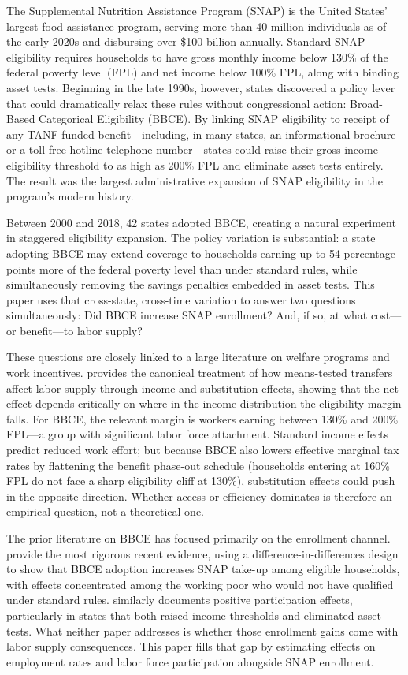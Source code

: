 \documentclass[12pt]{article}
\begin{document}
The Supplemental Nutrition Assistance Program (SNAP) is the United States' largest food assistance program, serving more than 40 million individuals as of the early 2020s and disbursing over \$100 billion annually. Standard SNAP eligibility requires households to have gross monthly income below 130\% of the federal poverty level (FPL) and net income below 100\% FPL, along with binding asset tests. Beginning in the late 1990s, however, states discovered a policy lever that could dramatically relax these rules without congressional action: Broad-Based Categorical Eligibility (BBCE). By linking SNAP eligibility to receipt of any TANF-funded benefit---including, in many states, an informational brochure or a toll-free hotline telephone number---states could raise their gross income eligibility threshold to as high as 200\% FPL and eliminate asset tests entirely. The result was the largest administrative expansion of SNAP eligibility in the program's modern history.

Between 2000 and 2018, 42 states adopted BBCE, creating a natural experiment in staggered eligibility expansion. The policy variation is substantial: a state adopting BBCE may extend coverage to households earning up to 54 percentage points more of the federal poverty level than under standard rules, while simultaneously removing the savings penalties embedded in asset tests. This paper uses that cross-state, cross-time variation to answer two questions simultaneously: Did BBCE increase SNAP enrollment? And, if so, at what cost---or benefit---to labor supply?

These questions are closely linked to a large literature on welfare programs and work incentives. \citet{moffitt2002welfare} provides the canonical treatment of how means-tested transfers affect labor supply through income and substitution effects, showing that the net effect depends critically on where in the income distribution the eligibility margin falls. For BBCE, the relevant margin is workers earning between 130\% and 200\% FPL---a group with significant labor force attachment. Standard income effects predict reduced work effort; but because BBCE also lowers effective marginal tax rates by flattening the benefit phase-out schedule (households entering at 160\% FPL do not face a sharp eligibility cliff at 130\%), substitution effects could push in the opposite direction. Whether access or efficiency dominates is therefore an empirical question, not a theoretical one.

The prior literature on BBCE has focused primarily on the enrollment channel. \citet{anders2025bbce} provide the most rigorous recent evidence, using a difference-in-differences design to show that BBCE adoption increases SNAP take-up among eligible households, with effects concentrated among the working poor who would not have qualified under standard rules. \citet{wang2026bbce} similarly documents positive participation effects, particularly in states that both raised income thresholds and eliminated asset tests. What neither paper addresses is whether those enrollment gains come with labor supply consequences. This paper fills that gap by estimating effects on employment rates and labor force participation alongside SNAP enrollment.
\end{document}
